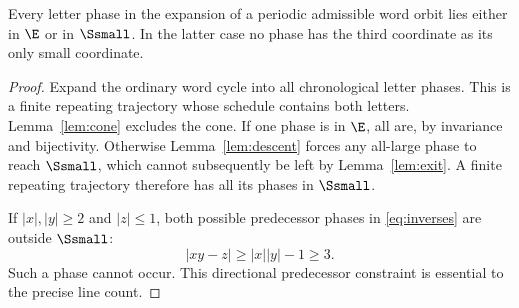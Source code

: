 \begin{corollary}\label{cor:periodicsmall}
Every letter phase in the expansion of a periodic admissible
word orbit lies either in $\E$ or in $\Ssmall$. In the latter
case no phase has the third coordinate as its only small
coordinate.
\end{corollary}

\begin{proof}
Expand the ordinary word cycle into all chronological letter
phases. This is a finite repeating trajectory whose schedule
contains both letters. Lemma~\ref{lem:cone} excludes the cone.
If one phase is in $\E$, all are, by invariance and
bijectivity. Otherwise Lemma~\ref{lem:descent} forces any
all-large phase to reach $\Ssmall$, which cannot subsequently
be left by Lemma~\ref{lem:exit}. A finite repeating trajectory
therefore has all its phases in $\Ssmall$.

If $|x|,|y|\ge2$ and $|z|\le1$, both possible predecessor
phases in \eqref{eq:inverses} are outside $\Ssmall$:
\[
 |xy-z|\ge |x||y|-1\ge3.
\]
Such a phase cannot occur. This directional predecessor
constraint is essential to the precise line count.
\end{proof}
